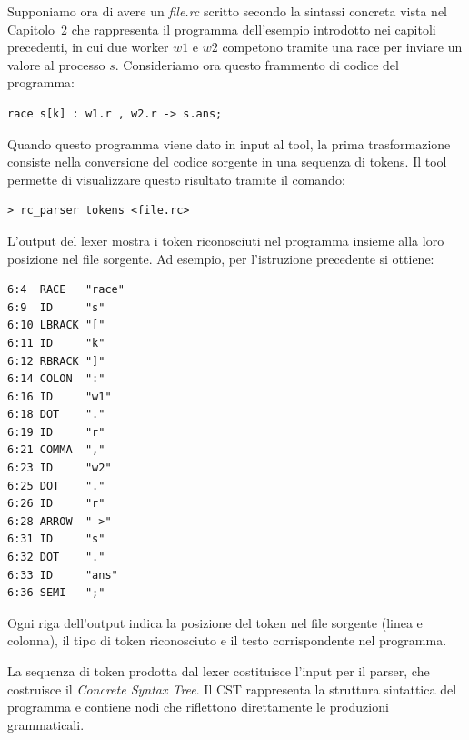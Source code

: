 Supponiamo ora di avere un \textit{file.rc} scritto secondo la sintassi concreta vista nel Capitolo~2 che rappresenta il programma dell'esempio introdotto nei capitoli precedenti, in cui due worker $w1$ e $w2$ competono tramite una race per inviare un valore al processo $s$. Consideriamo ora questo frammento di codice del programma:

\begin{tcolorbox}[colback=white,colframe=black!35,boxrule=0.4pt]
\begin{lstlisting}
race s[k] : w1.r , w2.r -> s.ans;
\end{lstlisting}
\end{tcolorbox}
Quando questo programma viene dato in input al tool, la prima trasformazione consiste nella conversione del codice sorgente in una sequenza di tokens. Il tool permette di visualizzare questo risultato tramite il comando:

\begin{tcolorbox}[colback=black!2,colframe=black!35,boxrule=0.4pt]
\begin{verbatim}
> rc_parser tokens <file.rc>
\end{verbatim}
\end{tcolorbox}

L’output del lexer mostra i token riconosciuti nel programma insieme alla loro posizione nel file sorgente. Ad esempio, per l’istruzione precedente si ottiene:

\begin{center}
\end{center}

\begin{samepage}
\begin{verbatim}
6:4  RACE   "race"
6:9  ID     "s"
6:10 LBRACK "["
6:11 ID     "k"
6:12 RBRACK "]"
6:14 COLON  ":"
6:16 ID     "w1"
6:18 DOT    "."
6:19 ID     "r"
6:21 COMMA  ","
6:23 ID     "w2"
6:25 DOT    "."
6:26 ID     "r"
6:28 ARROW  "->"
6:31 ID     "s"
6:32 DOT    "."
6:33 ID     "ans"
6:36 SEMI   ";"
\end{verbatim}
\end{samepage}

Ogni riga dell’output indica la posizione del token nel file sorgente (linea e colonna), il tipo di token riconosciuto e il testo corrispondente nel programma.

La sequenza di token prodotta dal lexer costituisce l’input per il parser, che costruisce il \textit{Concrete Syntax Tree}. Il CST rappresenta la struttura sintattica del programma e contiene nodi che riflettono direttamente le produzioni grammaticali.

